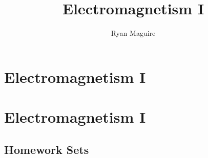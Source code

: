 \documentclass[crop=false,class=book,oneside]{standalone}
\begin{document}
    \ifx\ifphysicscourses\undefined
        \title{Electromagnetism I}
        \author{Ryan Maguire}
        \date{\vspace{-5ex}}
        \maketitle
        \tableofcontents
        \listoffigures
        \clearpage
        \setcounter{chapter}{27}
        \chapter{Electromagnetism I}
    \else
        \chapter{Electromagnetism I}
    \fi
    \section{Homework Sets}
\end{document}
